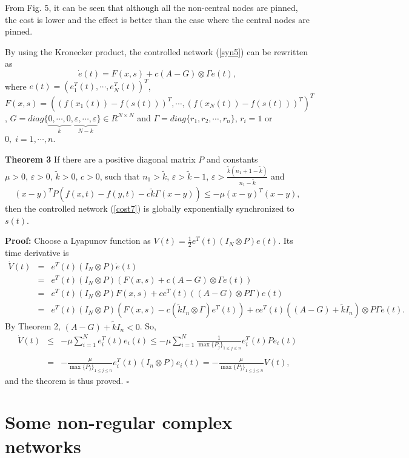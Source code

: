 \documentclass[11pt]{article}
\def\dref#1{(\ref{#1})}
\begin{document}
From Fig. 5, it can be seen that although all the non-central nodes
are pinned, the cost is lower and the effect is better than the case
where the central nodes are pinned.

By using the Kronecker product, the controlled network \dref{syn5}
can be rewritten as
\begin{equation} \label{cost9}
\dot e(t)=F(x,s)+c(A-G)\otimes\Gamma e(t),
\end{equation}
where $e(t)=(e_1^T(t),\cdots,e_N^T(t))^T$,
$F(x,s)=((f(x_1(t))-f(s(t)))^T,\cdots,(f(x_N(t))-f(s(t)))^T)^T$,
$G=diag\{\underbrace{0,\cdots,0}_k,\underbrace{\varepsilon,\cdots,\varepsilon}_{N-k}\}\in
R^{N\times N}$ and $\Gamma=diag\{r_1,r_2,\cdots,r_n\}$, $r_i=1$ or
$0,\;i=1,\cdots,n$.

\textbf {Theorem 3} If there are a positive diagonal matrix $P$ and
constants $\mu>0,\,\varepsilon>0,\,\tilde{k}>0,\,c>0$, such that
$n_1>\tilde{k}$, $\varepsilon>\tilde{k}-1$,
$\varepsilon>\frac{\tilde{k}(n_1+1-\tilde{k})}{n_1-\tilde{k}}$ and
$$
(x-y)^TP(f(x,t)-f(y,t)-c\tilde{k}\Gamma(x-y))\leq-\mu(x-y)^T(x-y),
$$
then the controlled network \dref{cost7} is globally exponentially
synchronized to $s(t)$.

{\bf Proof:} Choose a Lyapunov function as
$V(t)=\frac{1}{2}e^T(t)(I_N\otimes P)e(t)$. Its time derivative is
$$ \begin{array}{ccl}
\dot V(t)&=&e^T(t)(I_N\otimes P)\dot e(t)\\
         &=&e^T(t)(I_N\otimes P)(F(x,s)+c(A-G)\otimes\Gamma e(t))\\
         &=&e^T(t)(I_N\otimes P)F(x,s)+ce^T(t)((A-G)\otimes P\Gamma)e(t)\\
         &=&e^T(t)(I_N\otimes P)(F(x,s)-c(\tilde{k}I_n\otimes
              \Gamma)e^T(t))+ce^T(t)((A-G)+\tilde{k}I_n)\otimes P\Gamma
              e(t).
\end{array}
$$
By \textrm{Theorem 2}, $(A-G)+\tilde{k}I_n<0$. So,
$$ \begin{array}{ccl}
\dot
V(t)&\leq&-\mu\sum_{i=1}^Ne_i^T(t)e_i(t)\leq-\mu\sum_{i=1}^N\frac{1}{\max\{P_j\}_{1\leq
j\leq n}}e_i^T(t)Pe_i(t)\\
\\
&=&-\frac{\mu}{\max\{P_j\}_{1\leq j\leq n}}e_i^T(t)(I_n\otimes
P)e_i(t)=-\frac{\mu}{\max\{P_j\}_{1\leq j\leq n}}V(t),
\end{array}$$
and the theorem is thus proved. \hfill $\square$

\section{Some non-regular complex networks}
\end{document}

